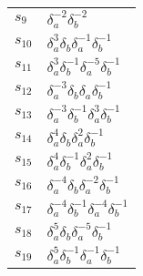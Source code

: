 \documentclass{article}
\begin{document}
\begin{center}
\begin{tabular}{ll}
$s_{9}$ & $\delta_a^{-2}\delta_b^{-2}$ \\
$s_{10}$ & $\delta_a^{3}\delta_b^{}\delta_a^{-1}\delta_b^{-1}$ \\
$s_{11}$ & $\delta_a^{3}\delta_b^{-1}\delta_a^{-5}\delta_b^{-1}$ \\
$s_{12}$ & $\delta_a^{-3}\delta_b^{}\delta_a^{}\delta_b^{-1}$ \\
$s_{13}$ & $\delta_a^{-3}\delta_b^{-1}\delta_a^{3}\delta_b^{-1}$ \\
$s_{14}$ & $\delta_a^{4}\delta_b^{}\delta_a^{2}\delta_b^{-1}$ \\
$s_{15}$ & $\delta_a^{4}\delta_b^{-1}\delta_a^{2}\delta_b^{-1}$ \\
$s_{16}$ & $\delta_a^{-4}\delta_b^{}\delta_a^{-2}\delta_b^{-1}$ \\
$s_{17}$ & $\delta_a^{-4}\delta_b^{-1}\delta_a^{-4}\delta_b^{-1}$ \\
$s_{18}$ & $\delta_a^{5}\delta_b^{}\delta_a^{-5}\delta_b^{-1}$ \\
$s_{19}$ & $\delta_a^{5}\delta_b^{-1}\delta_a^{-1}\delta_b^{-1}$ \\
\bottomrule
\end{tabular}
\end{center}

\thispagestyle{empty}
\end{document}
